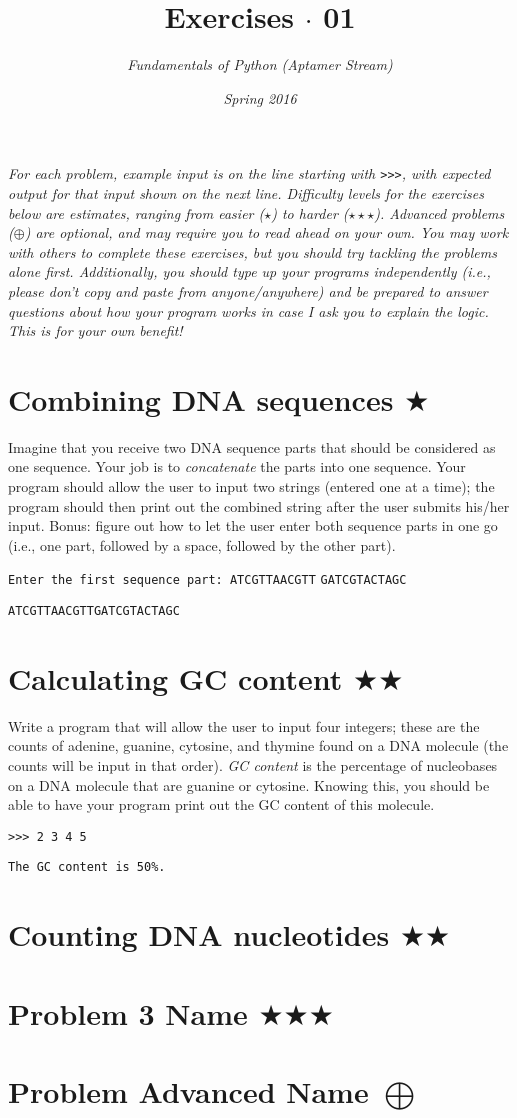 \documentclass[12pt, letterpaper]{article}
\title{Exercises $\cdot$ 01}
\author{\textit{Fundamentals of Python (Aptamer Stream)}}
\date{\textit{Spring 2016}}
\begin{document}
\maketitle
\textit{For each problem, example input is on the line starting with \texttt{>{>}>}, with expected output for that input shown on the next line. Difficulty levels for the exercises below are estimates, ranging from easier ($\star$) to harder ($\star\star\star$). Advanced problems ($\oplus$) are optional, and may require you to read ahead on your own. You may work with others to complete these exercises, but you should try tackling the problems alone first. Additionally, you should type up your programs independently (i.e., please don't copy and paste from anyone/anywhere) and be prepared to answer questions about how your program works in case I ask you to explain the logic. This is for your own benefit!}


\section{\upshape Combining DNA sequences $\bigstar$}
Imagine that you receive two DNA sequence parts that should be considered as one sequence. Your job is to \emph{concatenate} the parts into one sequence. Your program should allow the user to input two strings (entered one at a time); the program should then print out the combined string after the user submits his/her input. Bonus: figure out how to let the user enter both sequence parts in one go (i.e., one part, followed by a space, followed by the other part).

\texttt{Enter the first sequence part: ATCGTTAACGTT}
\texttt{GATCGTACTAGC}

\texttt{ATCGTTAACGTTGATCGTACTAGC}

\section{\upshape Calculating GC content $\bigstar\bigstar$}
Write a program that will allow the user to input four integers; these are the counts of adenine, guanine, cytosine, and thymine found on a DNA molecule (the counts will be input in that order). \emph{GC content} is the percentage of nucleobases on a DNA molecule that are guanine or cytosine. Knowing this, you should be able to have your program print out the GC content of this molecule.

\texttt{>{>}> 2 3 4 5}

\texttt{The GC content is 50\%.}

\section{\upshape Counting DNA nucleotides $\bigstar\bigstar$}







\section{\upshape Problem 3 Name $\bigstar\bigstar\bigstar$}

\section{\upshape Problem Advanced Name $\bigoplus$}
\end{document}
